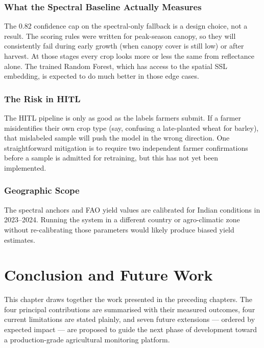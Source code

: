 \documentclass[12pt,a4paper,oneside]{report}
\begin{document}
\subsection{What the Spectral Baseline Actually Measures}

The 0.82 confidence cap on the spectral-only fallback is a design choice, not a
result. The scoring rules were written for peak-season canopy, so they will
consistently fail during early growth (when canopy cover is still low) or after
harvest. At those stages every crop looks more or less the same from reflectance
alone. The trained Random Forest, which has access to the spatial SSL embedding,
is expected to do much better in those edge cases.

\subsection{The Risk in HITL}

The HITL pipeline is only as good as the labels farmers submit. If a farmer
misidentifies their own crop type (say, confusing a late-planted wheat for barley),
that mislabeled sample will push the model in the wrong direction. One straightforward
mitigation is to require two independent farmer confirmations before a sample is
admitted for retraining, but this has not yet been implemented.

\subsection{Geographic Scope}

The spectral anchors and FAO yield values are calibrated for Indian conditions in
2023--2024. Running the system in a different country or agro-climatic zone without
re-calibrating those parameters would likely produce biased yield estimates.

\chapter{Conclusion and Future Work}

This chapter draws together the work presented in the preceding chapters. The four principal contributions are summarised with their measured outcomes, four current limitations are stated plainly, and seven future extensions — ordered by expected impact — are proposed to guide the next phase of development toward a production-grade agricultural monitoring platform.
\end{document}

